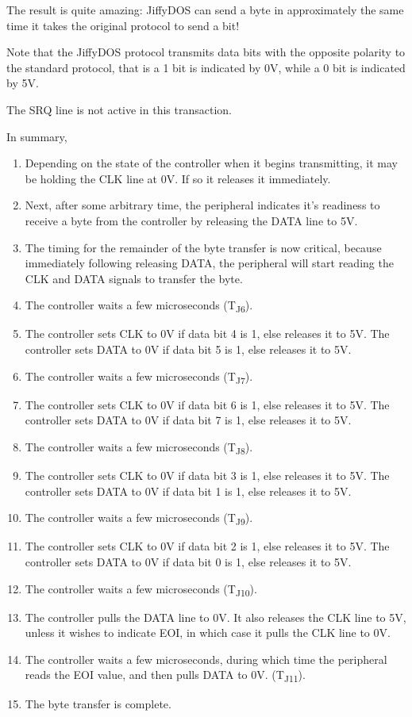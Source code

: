 The result is quite amazing: JiffyDOS{\texttrademark} can send a byte
in approximately the same time it takes the original protocol to send
a bit!

Note that the JiffyDOS{\texttrademark} protocol transmits data bits with the opposite polarity
to the standard protocol, that is a 1 bit is indicated by 0V, while a
0 bit is indicated by 5V.

The SRQ line is not active in this transaction.

In summary,

\begin{enumerate}
\item Depending on the state of the controller when it begins
  transmitting, it may be holding the CLK line at 0V. If so it
  releases it immediately.
\item Next, after some arbitrary time, the peripheral indicates
  it's readiness to receive a byte from the controller by
  releasing the DATA line to 5V.
\item The timing for the remainder of the byte transfer is now
  critical, because immediately following releasing DATA, the
  peripheral will start reading the CLK and DATA signals to
  transfer the byte.
\item The controller waits a few microseconds
  (T\textsubscript{J6}).
\item The controller sets CLK to 0V if data bit 4 is 1, else
  releases it to 5V.  The controller sets DATA to 0V if data
  bit 5 is 1, else releases it to 5V.
\item The controller waits a few microseconds
  (T\textsubscript{J7}).
\item The controller sets CLK to 0V if data bit 6 is 1, else
  releases it to 5V.  The controller sets DATA to 0V if data
  bit 7 is 1, else releases it to 5V.
\item The controller waits a few microseconds
  (T\textsubscript{J8}).
\item The controller sets CLK to 0V if data bit 3 is 1, else
  releases it to 5V.  The controller sets DATA to 0V if data
  bit 1 is 1, else releases it to 5V.
\item The controller waits a few microseconds
  (T\textsubscript{J9}).
\item The controller sets CLK to 0V if data bit 2 is 1, else
  releases it to 5V.  The controller sets DATA to 0V if data
  bit 0 is 1, else releases it to 5V.
\item The controller waits a few microseconds
  (T\textsubscript{J10}).
\item The controller pulls the DATA line to 0V. It also releases the
  CLK line to 5V, unless it wishes to indicate EOI, in which
  case it pulls the CLK line to 0V.
\item The controller waits a few microseconds, during which time the
  peripheral reads the EOI value, and then pulls DATA to 0V.
  (T\textsubscript{J11}).
\item The byte transfer is complete.
\end{enumerate}

